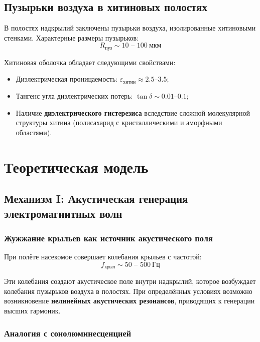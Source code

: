 \documentclass[12pt,a4paper]{article}
\begin{document}
\subsection{Пузырьки воздуха в хитиновых полостях}

В полостях надкрылий заключены пузырьки воздуха, изолированные хитиновыми стенками. Характерные размеры пузырьков:
\begin{equation}
    R_{\text{пуз}} \sim 10 \text{ -- } 100~\text{мкм}
\end{equation}

Хитиновая оболочка обладает следующими свойствами:
\begin{itemize}
    \item Диэлектрическая проницаемость: $\varepsilon_{\text{хитин}} \approx 2.5$--$3.5$;
    \item Тангенс угла диэлектрических потерь: $\tan \delta \sim 0.01$--$0.1$;
    \item Наличие \textbf{диэлектрического гистерезиса} вследствие сложной молекулярной структуры хитина (полисахарид с кристаллическими и аморфными областями).
\end{itemize}

\section{Теоретическая модель}

\subsection{Механизм I: Акустическая генерация электромагнитных волн}

\subsubsection{Жужжание крыльев как источник акустического поля}

При полёте насекомое совершает колебания крыльев с частотой:
\begin{equation}
    f_{\text{крыл}} \sim 50 \text{ -- } 500~\text{Гц}
\end{equation}

Эти колебания создают акустическое поле внутри надкрылий, которое возбуждает колебания пузырьков воздуха в полостях. При определённых условиях возможно возникновение \textbf{нелинейных акустических резонансов}, приводящих к генерации высших гармоник.

\subsubsection{Аналогия с сонолюминесценцией}
\end{document}
